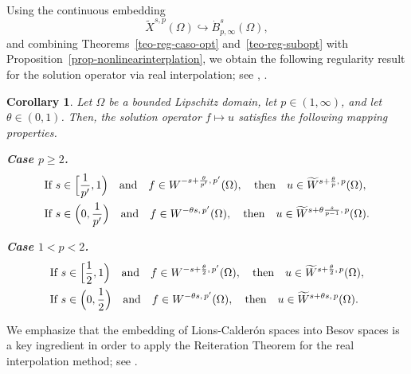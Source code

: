 \documentclass[]{amsart}
\newtheorem{corollary}{Corollary}[theorem]
\theoremstyle{definition}
\theoremstyle{definition}
\theoremstyle{remark}
\numberwithin{equation}{section}
\begin{document}
	Using the continuous embedding
	\[
	\widetilde{X}^{s,p}(\Omega) \hookrightarrow \dot{B}_{p,\infty}^{s}(\Omega),
	\]
	and combining Theorems~\ref{teo-reg-caso-opt} and~\ref{teo-reg-subopt} with 
    Proposition~\ref{prop-nonlinearinterplation}, we obtain the following regularity result for the solution operator via real interpolation; see \cite[Theorem 2]{savare1998regularity}, \cite[Corollary 3.2]{borthagaray2024quasi}.
	
	\begin{corollary}
		Let $\Omega$ be a bounded Lipschitz domain, let $p \in (1,\infty)$, and let $\theta \in (0,1)$.  
		Then, the solution operator $f \mapsto u$ satisfies the following mapping properties.
		
		\medskip
		
		\noindent\textbf{Case $p \geq 2$.}
		\begin{align*}
			&\text{If } s \in \Bigl[\frac{1}{p'},1\Bigr)
			\quad \text{and} \quad
			f \in W^{-s+\frac{\theta}{p'},\,p'}(\Omega),
			\quad \text{then} \quad
			u \in \widetilde{W}^{s+\frac{\theta}{p},\,p}(\Omega), \\
			&\text{If } s \in \Bigl(0,\frac{1}{p'}\Bigr)
			\quad \text{and} \quad
			f \in W^{-\theta s,\,p'}(\Omega),
			\quad \text{then} \quad
			u \in \widetilde{W}^{s+\theta\frac{s}{p-1},\,p}(\Omega).
		\end{align*}
		
		\medskip
		
		\noindent\textbf{Case $1<p<2$.}
		\begin{align*}
			&\text{If } s \in \Bigl[\frac{1}{2},1\Bigr)
			\quad \text{and} \quad
			f \in W^{-s+\frac{\theta}{2},\,p'}(\Omega),
			\quad \text{then} \quad
			u \in \widetilde{W}^{s+\frac{\theta}{2},\,p}(\Omega), \\
			&\text{If } s \in \Bigl(0,\frac{1}{2}\Bigr)
			\quad \text{and} \quad
			f \in W^{-\theta s,\,p'}(\Omega),
			\quad \text{then} \quad
			u \in \widetilde{W}^{s+\theta s,\,p}(\Omega).
		\end{align*}
	\end{corollary}
	
	We emphasize that the embedding of Lions-Calderón spaces into Besov spaces is a key ingredient in order to apply the Reiteration Theorem for the real interpolation method; see \cite[Theorem~2.3]{bellido2025bessel}.  
	
\end{document}
